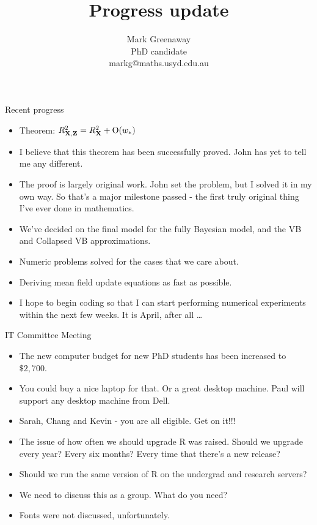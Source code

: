 \documentclass{beamer}
\title{Progress update}
\author{Mark Greenaway\\PhD candidate\\markg@maths.usyd.edu.au}
\begin{document}
\begin{frame}
\titlepage
\end{frame}


\begin{frame}{Recent progress}
\begin{itemize}
\def \O { \text{O} }
\item Theorem: $R^2_{\mX, \mZ} = R^2_\mX + \O(w_*)$
\item I believe that this theorem has been successfully proved. John has yet to tell me any different.
\item The proof is largely original work. John set the problem, but I solved it in my own way. So that's a
			major milestone passed - the first truly original thing I've ever done in mathematics.
\item We've decided on the final model for the fully Bayesian model, and the VB and Collapsed VB
			approximations.
\item Numeric problems solved for the cases that we care about.
\item Deriving mean field update equations as fast as possible.
\item I hope to begin coding so that I can start performing numerical experiments within the next few
			weeks. It is April, after all \ldots
\end{itemize}
\end{frame}


\begin{frame}{IT Committee Meeting}
\begin{itemize}
\item The new computer budget for new PhD students has been increased to $\$2,700$.
\item You could buy a nice laptop for that. Or a great desktop machine. Paul will support any desktop
			machine from Dell.
\item Sarah, Chang and Kevin - you are all eligible. Get on it!!!
\item The issue of how often we should upgrade R was raised. Should we upgrade every year? Every six months?
			Every time that there's a new release?
\item Should we run the same version of R on the undergrad and research servers?
\item We need to discuss this as a group. What do you need?
\item Fonts were not discussed, unfortunately.
\end{itemize}
\end{frame}
\end{document}
